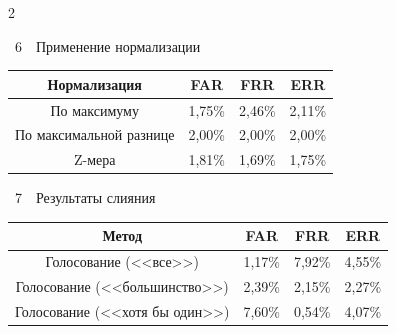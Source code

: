 \begin{multicols}{2}
\begin{center}
 

 \vspace*{9pt}

 

 {{\tablename~6}\ \ \small{Применение нормализации}}



\vspace*{6pt}



{\small

\begin{tabular}{|c|c|c|c|}

\hline

Нормализация  & FAR      & FRR      & ERR\\

\hline

По максимуму & 1,75\% & 2,46\% &2,11\%\\

По максимальной разнице & 2,00\% & 2,00\% &2,00\%\\

Z-мера & 1,81\% & 1,69\% &1,75\%\\

\hline

\end{tabular}

}



\vspace*{6pt}

 

 {{\tablename~7}\ \ \small{Результаты слияния}}



\vspace*{6pt}



{\small

\tabcolsep=4pt

\begin{tabular}{|c|c|c|c|}

\hline

Метод  & FAR      & FRR      & ERR\\

\hline

Голосование (<<все>>) & 1,17\% & 7,92\% &4,55\%\\

Голосование (<<большинство>>) & 2,39\% & 2,15\% &2,27\%\\

Голосование (<<хотя бы один>>) & 7,60\% & 0,54\% &4,07\%\\


\end{tabular}}
\end{center}
\end{multicols}
